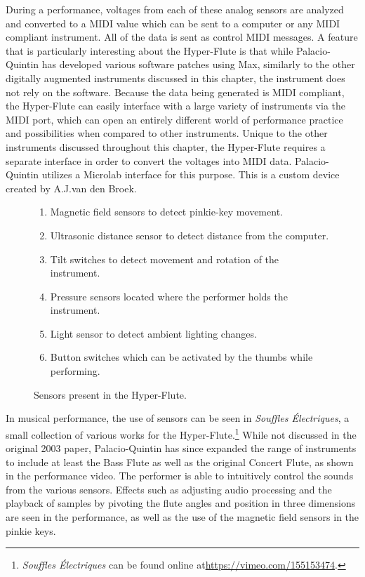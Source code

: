During a performance, voltages from each of these analog sensors are analyzed and converted to a MIDI value which can be sent to a computer or any MIDI compliant instrument. All of the data is sent as control MIDI messages. A feature that is particularly interesting about the Hyper-Flute is that while Palacio-Quintin has developed various software patches using Max, similarly to the other digitally augmented instruments discussed in this chapter, the instrument does not rely on the software. Because the data being generated is MIDI compliant, the Hyper-Flute can easily interface with a large variety of instruments via the MIDI port, which can open an entirely different world of performance practice and possibilities when compared to other instruments\cite{hyper-flute2003}. Unique to the other instruments discussed throughout this chapter, the Hyper-Flute requires a separate interface in order to convert the voltages into MIDI data. Palacio-Quintin utilizes a Microlab interface for this purpose. This is a custom device created by A.J.van den Broek\cite{hyper-flute2003}. 

\begin{figure}
    \centering
    \begin{enumerate}
        \item Magnetic field sensors to detect pinkie-key movement.
        \item Ultrasonic distance sensor to detect distance from the computer.
        \item Tilt switches to detect movement and rotation of the instrument.
        \item Pressure sensors located where the performer holds the instrument.
        \item Light sensor to detect ambient lighting changes.
        \item Button switches which can be activated by the thumbs while performing.
    \end{enumerate}
    \caption{Sensors present in the Hyper-Flute.}
    \label{fig:hyper-flute-sensors}
\end{figure}

In musical performance, the use of sensors can be seen in \textit{Souffles Électriques}, a small collection of various works for the Hyper-Flute.\footnote{\textit{Souffles Électriques} can be found online at\url{https://vimeo.com/155153474}.} While not discussed in the original 2003 paper, Palacio-Quintin has since expanded the range of instruments to include at least the Bass Flute as well as the original Concert Flute, as shown in the performance video. The performer is able to intuitively control the sounds from the various sensors. Effects such as adjusting audio processing and the playback of samples by pivoting the flute angles and position in three dimensions are seen in the performance, as well as the use of the magnetic field sensors in the pinkie keys.


